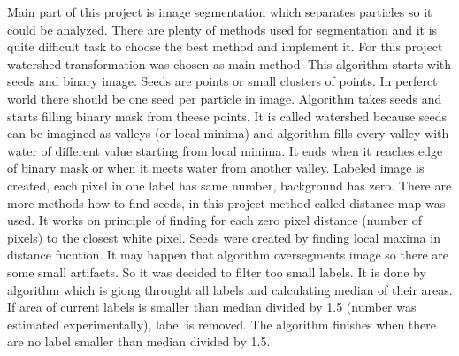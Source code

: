 Main part of this project is image segmentation which separates particles so it could
be analyzed. There are plenty of methods used for segmentation and it is quite difficult
task to choose the best method and implement it. For this project watershed transformation
was chosen as main method. This algorithm starts with seeds and binary image. Seeds are
points or small clusters of points. In perferct world there should be one seed per
particle in image. Algorithm takes seeds and starts filling binary mask from theese points.
It is called watershed because seeds can be imagined as valleys (or local minima) and
algorithm fills every valley with water of different value starting from local minima.
It ends when it reaches edge of binary mask or when it meets water from another valley.
Labeled image is created, each pixel in one label has same number, background has zero.
There are more methods how to find seeds, in this project method called distance map
was used. It works on principle of finding for each zero pixel distance (number of pixels)
to the closest white pixel. Seeds were created by finding local maxima in distance fucntion.
It may happen that algorithm oversegments image so there are some small artifacts. So it
was decided to filter too small labels. It is done by algorithm which is giong throught
all labels and calculating median of their areas. If area of current labels is smaller
than median divided by 1.5 (number was estimated experimentally), label is removed.
The algorithm finishes when there are no label smaller than median divided by 1.5.

